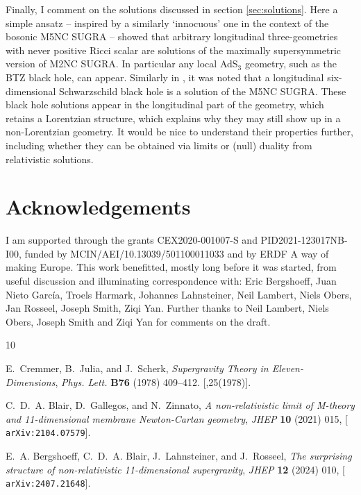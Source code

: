 \documentclass[11pt]{article}
\numberwithin{equation}{section}
\begin{document}
{{Finally, I comment on the solutions discussed in section \ref{sec:solutions}.
Here a simple ansatz -- inspired by a similarly `innocuous' one in the context of the bosonic M5NC SUGRA \cite{Bergshoeff:2025grj} -- showed that arbitrary longitudinal three-geometries with never positive Ricci scalar are solutions of the maximally supersymmetric version of M2NC SUGRA.
In particular any local AdS${}_3$ geometry, such as the BTZ black hole, can appear.
Similarly in \cite{Bergshoeff:2025grj}, it was noted that a longitudinal six-dimensional Schwarzschild black hole is a solution of the M5NC SUGRA. These black hole solutions appear in the longitudinal part of the geometry, which retains a Lorentzian structure, which explains why they may still show up in a non-Lorentzian geometry. It would be nice to understand their properties further, including whether they can be obtained via limits or (null) duality from relativistic solutions.

\section*{Acknowledgements}

I am supported through the grants CEX2020-001007-S and PID2021-123017NB-I00, funded by MCIN/AEI/10.13039/501100011033 and by ERDF A way of making Europe.
This work benefitted, mostly long before it was started, from useful discussion and illuminating correspondence with: Eric Bergshoeff, Juan Nieto García, Troels Harmark, Johannes Lahnsteiner, Neil Lambert, Niels Obers, Jan Rosseel, Joseph Smith, Ziqi Yan. Further thanks to Neil Lambert, Niels Obers, Joseph Smith and Ziqi Yan for comments on the draft.


\providecommand{\href}[2]{#2}\begingroup\raggedright\begin{thebibliography}{10}

E.~Cremmer, B.~Julia, and J.~Scherk, {\it {Supergravity Theory in
  Eleven-Dimensions}},  {\em Phys. Lett.} {\bf B76} (1978) 409--412.
  [,25(1978)].

C.~D.~A. Blair, D.~Gallegos, and N.~Zinnato, {\it {A non-relativistic limit of
  M-theory and 11-dimensional membrane Newton-Cartan geometry}},  {\em JHEP}
  {\bf 10} (2021) 015, [\href{http://arxiv.org/abs/2104.07579}{{\tt
  arXiv:2104.07579}}].

E.~A. Bergshoeff, C.~D.~A. Blair, J.~Lahnsteiner, and J.~Rosseel, {\it {The
  surprising structure of non-relativistic 11-dimensional supergravity}},  {\em
  JHEP} {\bf 12} (2024) 010, [\href{http://arxiv.org/abs/2407.21648}{{\tt
  arXiv:2407.21648}}].


\end{thebibliography}}}
\end{document}
